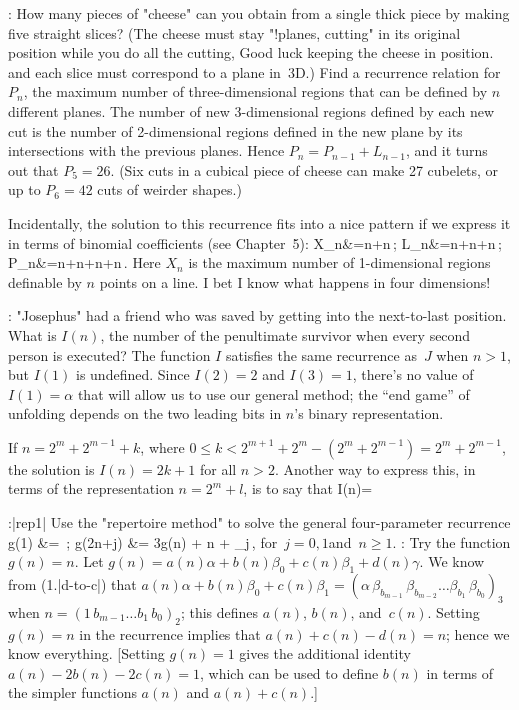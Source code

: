 \ex:
How many pieces of "cheese" can you obtain from a single thick piece
by making five straight slices? (The cheese must stay
"!planes, cutting"
in its original position while you do all the cutting,
\g Good luck keeping the cheese in position.\g
and each slice must correspond to a plane in~3D.) Find a recurrence
relation for $P_n$, the maximum number of three-dimensional regions that
can be defined by $n$ different planes.
\answer The number of new 3-dimensional
regions defined by each new cut is the number of 2-dimensional regions
defined in the new plane by its intersections with the previous planes.
Hence $P_n=P_{n-1}+L_{n-1}$, and it turns out that $P_5=26$. (Six cuts
in a cubical piece of cheese can make 27 cubelets, or up to $P_6=42$
cuts of weirder shapes.)\par
Incidentally, the solution to this recurrence fits into a nice pattern
if we express it in terms of binomial coefficients (see Chapter~5):
\begindisplay \openup 3pt
X_n&={n}+{n}\,;\cr
L_n&={n}+{n}+{n}\,;\cr
P_n&={n}+{n}+{n}+{n}\,.\cr
\enddisplay
Here $X_n$ is the
maximum number of 1-dimensional regions definable
by $n$ points on a line.
\g\null{}\baselineskip I bet I know what happens in four dimensions!\g%

\ex:
"Josephus" had a friend who was saved by getting into the next-to-last
position. What is $I(n)$, the number of the penultimate survivor
when every second person is executed?
\answer The function $I$ satisfies the same recurrence as~$J$
when $n>1$, but $I(1)$ is undefined.
Since $I(2)=2$ and $I(3)=1$, there's no value of $I(1)=\alpha$
that will allow us to use our general method; the ``end game'' of
unfolding depends on
the two leading bits in $n$'s binary representation.\par
If $n=2^m+2^{m-1}+k$, where $0\le k<2^{m+1}+2^m-(2^m+2^{m-1})=2^m+2^{m-1}$,
the solution is $I(n)=2k+1$ for all $n>2$. Another way to express this,
in terms of the representation $n=2^m+l$, is to say that
\begindisplay
I(n)=
\enddisplay

\ex:\exref|rep1|%
Use the "repertoire method" to solve the general four-parameter recurrence
\begindisplay
g(1)	&= \alpha \,; \cr
g(2n+j)	&= 3g(n) + \gamma n + \beta_j\,,
			\qquad\hbox{for $j=0,1$\quad and \quad $n \geq 1$.}
\enddisplay
\Hint: Try the function $g(n)=n$.
\answer Let $g(n)=a(n)\alpha+b(n)\beta_0+c(n)\beta_1+d(n)\gamma$.
We know from \equ(1.|d-to-c|) that $a(n)\alpha+b(n)\beta_0+c(n)\beta_1=
  (\alpha\, \beta_{b_{m-1}}\, \beta_{b_{m-2}}
\ldots \beta_{b_1}\, \beta_{b_0})_3$ when
$n=(1\, b_{m-1} \ldots b_1\, b_0)_2$; this defines $a(n)$, $b(n)$, and~$c(n)$.
Setting $g(n)=n$ in the recurrence implies that $a(n)+c(n)-d(n)=n$;
hence we know everything.
[Setting $g(n)=1$ gives the additional identity $a(n)-2b(n)-2c(n)=1$, which
can be used to define $b(n)$ in terms of the simpler functions $a(n)$
and $a(n)+c(n)$.]

